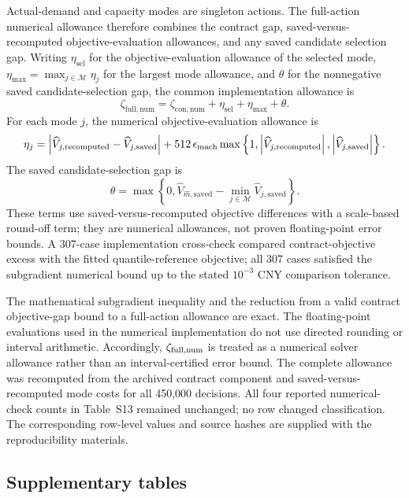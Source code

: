\documentclass[]{interact}
\begin{document}
Actual-demand and capacity modes are singleton actions. The full-action
numerical allowance therefore combines the contract gap, saved-versus-
recomputed objective-evaluation allowances, and any saved candidate
selection gap. Writing $\eta_{\mathrm{sel}}$ for the objective-evaluation
allowance of the selected mode, $\eta_{\max}=\max_{j\in\mathcal M}\eta_j$
for the largest mode allowance, and $\theta$ for the nonnegative saved
candidate-selection gap, the common implementation allowance is
\[
\zeta_{\mathrm{full,num}}
=\zeta_{\mathrm{con,num}}
+\eta_{\mathrm{sel}}+\eta_{\max}+\theta.
\]
For each mode $j$, the numerical objective-evaluation allowance is
\[
\eta_j
=
\left|\widehat V_{j,\mathrm{recomputed}}-\widehat V_{j,\mathrm{saved}}\right|
+512\,\epsilon_{\rm mach}
\max\left\{1,
\left|\widehat V_{j,\mathrm{recomputed}}\right|,
\left|\widehat V_{j,\mathrm{saved}}\right|
\right\}.
\]
The saved candidate-selection gap is
\[
\theta=\max\left\{0,
\widehat V_{\widehat m,\mathrm{saved}}
-\min_{j\in\mathcal M}\widehat V_{j,\mathrm{saved}}
\right\}.
\]
These terms use saved-versus-recomputed objective differences with a
scale-based round-off term; they are numerical allowances, not proven
floating-point error bounds. A 307-case implementation cross-check
compared contract-objective excess with the fitted quantile-reference
objective; all 307 cases satisfied the subgradient numerical bound up
to the stated $10^{-3}$ CNY comparison tolerance.

The mathematical subgradient inequality and the reduction from a valid
contract objective-gap bound to a full-action allowance are exact. The
floating-point evaluations used in the numerical implementation do not
use directed rounding or interval arithmetic. Accordingly,
$\zeta_{\rm full,num}$ is treated as a numerical solver allowance
rather than an interval-certified error bound. The complete allowance
was recomputed from the archived contract component and saved-versus-
recomputed mode costs for all 450,000 decisions. All four reported
numerical-check counts in Table~S13 remained unchanged; no row changed
classification. The corresponding row-level values and source hashes
are supplied with the reproducibility materials.

\clearpage

\clearpage
\subsection*{Supplementary tables}


\FloatBarrier
\end{document}
